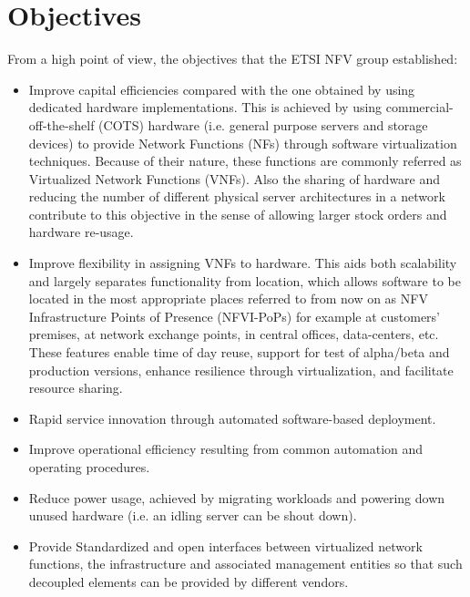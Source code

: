 \section{Objectives}
From a high point of view, the objectives that the ETSI NFV group established:
\begin{itemize}
	\item Improve capital efficiencies compared with the one obtained by using dedicated hardware implementations. This is achieved by using commercial-off-the-shelf (COTS) hardware (i.e. general purpose servers and storage devices) to provide Network Functions (NFs) through software virtualization techniques. Because of their nature, these functions are commonly referred as Virtualized Network Functions (VNFs). Also the sharing of hardware and reducing the number of different physical server architectures in a network contribute to this objective in the sense of allowing larger stock orders and hardware re-usage.
	\item Improve flexibility in assigning VNFs to hardware. This aids both scalability and largely separates functionality from location, which allows software to be located in the most appropriate places referred to from now on as NFV Infrastructure Points of Presence (NFVI-PoPs) for example at customers' premises, at network exchange points, in central offices, data-centers, etc. These features enable time of day reuse, support for test of alpha/beta and production versions, enhance resilience through virtualization, and facilitate resource sharing.
	\item Rapid service innovation through automated software-based deployment.
	\item Improve operational efficiency resulting from common automation and operating procedures.
	\item Reduce power usage, achieved by migrating workloads and powering down unused hardware (i.e. an idling server can be shout down).
	\item Provide Standardized and open interfaces between virtualized network functions, the infrastructure and associated management entities so that such decoupled elements can be provided by different vendors.
\end{itemize}


